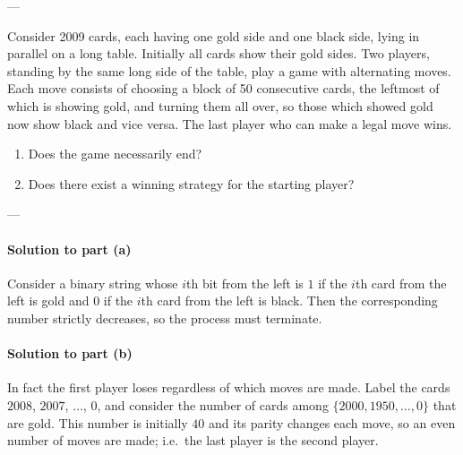 
---

Consider 2009 cards, each having one gold side and one black side, lying in parallel on a long
table. Initially all cards show their gold sides. Two players, standing by the same long side of
the table, play a game with alternating moves. Each move consists of choosing a block of 50
consecutive cards, the leftmost of which is showing gold, and turning them all over, so those
which showed gold now show black and vice versa. The last player who can make a legal move
wins.
\begin{enumerate}[label=(\alph*),itemsep=0em]
    \item Does the game necessarily end?
    \item Does there exist a winning strategy for the starting player?
\end{enumerate}

---

\paragraph{Solution to part (a)} Consider a binary string whose $i$th bit from the left is $1$ if the $i$th card from the left is gold and $0$ if the $i$th card from the left is black. Then the corresponding number strictly decreases, so the process must terminate.

\paragraph{Solution to part (b)} In fact the first player loses regardless of which moves are made. Label the cards $2008$, $2007$, $\ldots$, $0$, and consider the number of cards among $\{2000,1950,\ldots,0\}$ that are gold. This number is initially $40$ and its parity changes each move, so an even number of moves are made; i.e.\ the last player is the second player.

